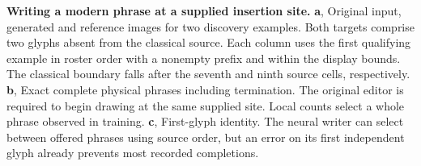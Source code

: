 \textbf{Writing a modern phrase at a supplied insertion site.}
\textbf{a}, Original input, generated and reference images for two discovery examples. Both targets comprise two glyphs absent from the classical source. Each column uses the first qualifying example in roster order with a nonempty prefix and within the display bounds. The classical boundary falls after the seventh and ninth source cells, respectively.
\textbf{b}, Exact complete physical phrases including termination. The original editor is required to begin drawing at the same supplied site. Local counts select a whole phrase observed in training.
\textbf{c}, First-glyph identity. The neural writer can select between offered phrases using source order, but an error on its first independent glyph already prevents most recorded completions.
